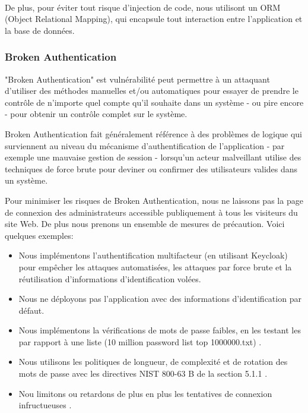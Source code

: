         \paragraph{}
        De plus, pour éviter tout risque d'injection de code, nous utilisont un ORM (Object 
        Relational Mapping), qui encapsule tout interaction entre l'application et la
        base de données.

    \subsubsection{Broken Authentication}
        "Broken Authentication" est vulnérabilité peut permettre à un attaquant d'utiliser 
        des méthodes manuelles et/ou automatiques pour essayer de prendre le contrôle de 
        n'importe quel compte qu'il souhaite dans un système - ou pire encore - pour obtenir 
        un contrôle complet sur le système.
        \par 
        Broken Authentication fait généralement référence à des problèmes de logique 
        qui surviennent au niveau du mécanisme d’authentification de l’application - par exemple une 
        mauvaise gestion de session - lorsqu'un 
        acteur malveillant utilise des techniques de force brute pour deviner ou confirmer des 
        utilisateurs valides dans un système.
        \par 
        Pour minimiser les risques de Broken Authentication, nous ne laissons pas la page de connexion 
        des administrateurs accessible publiquement à tous les visiteurs du site Web. De plus nous prenons 
        un ensemble de mesures de précaution. Voici quelques exemples:
        \begin{itemize}
            \item Nous implémentons l'authentification multifacteur (en utilisant Keycloak) pour empêcher 
            les attaques automatisées, les attaques par force brute et 
            la réutilisation d'informations d'identification volées.
            \item Nous ne déployons pas l'application avec des informations d'identification par défaut.
            \item Nous implémentons la vérifications de mots de passe faibles, en les testant les 
             par rapport à une liste (10 million password list top 1000000.txt) \cite{weakpass}.
            \item Nous utilisons les politiques de longueur, de complexité et de rotation des mots de passe 
            avec les directives NIST 800-63 B de la section 5.1.1 \cite{grassi2016draft} \cite{nist}.
            \item Nou limitons ou retardons de plus en plus les tentatives de connexion infructueuses \cite{limitpass}.
        \end{itemize}
    
